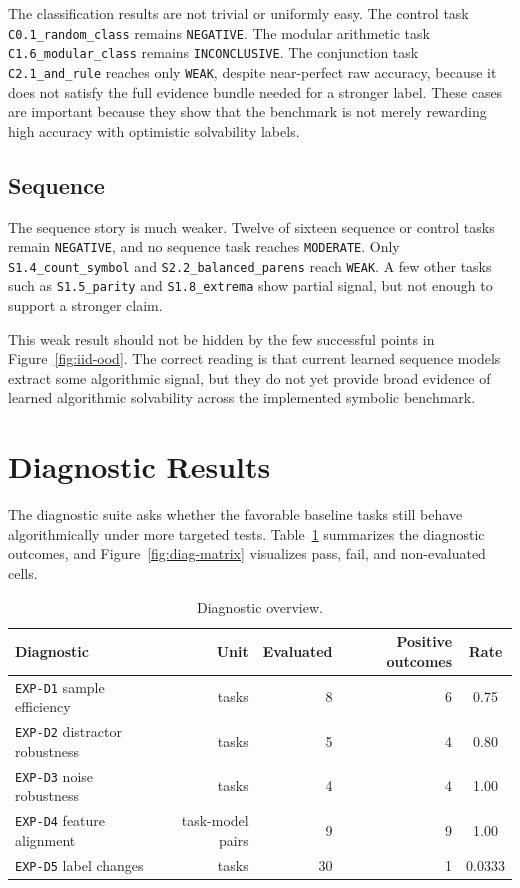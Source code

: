 \documentclass[11pt]{article}
\begin{document}
The classification results are not trivial or uniformly easy. The control task \texttt{C0.1\_random\_class} remains \texttt{NEGATIVE}. The modular arithmetic task \texttt{C1.6\_modular\_class} remains \texttt{INCONCLUSIVE}. The conjunction task \texttt{C2.1\_and\_rule} reaches only \texttt{WEAK}, despite near-perfect raw accuracy, because it does not satisfy the full evidence bundle needed for a stronger label. These cases are important because they show that the benchmark is not merely rewarding high accuracy with optimistic solvability labels.

\subsection{Sequence}

The sequence story is much weaker. Twelve of sixteen sequence or control tasks remain \texttt{NEGATIVE}, and no sequence task reaches \texttt{MODERATE}. Only \texttt{S1.4\_count\_symbol} and \texttt{S2.2\_balanced\_parens} reach \texttt{WEAK}. A few other tasks such as \texttt{S1.5\_parity} and \texttt{S1.8\_extrema} show partial signal, but not enough to support a stronger claim.

This weak result should not be hidden by the few successful points in Figure~\ref{fig:iid-ood}. The correct reading is that current learned sequence models extract some algorithmic signal, but they do not yet provide broad evidence of learned algorithmic solvability across the implemented symbolic benchmark.

\section{Diagnostic Results}

The diagnostic suite asks whether the favorable baseline tasks still behave algorithmically under more targeted tests. Table~\ref{tab:diagnostics} summarizes the diagnostic outcomes, and Figure~\ref{fig:diag-matrix} visualizes pass, fail, and non-evaluated cells.

\begin{table}[H]
\centering
\caption{Diagnostic overview.}
\label{tab:diagnostics}
\begin{tabular}{lrrrc}
\toprule
Diagnostic & Unit & Evaluated & Positive outcomes & Rate \\
\midrule
\texttt{EXP-D1} sample efficiency & tasks & 8 & 6 & 0.75 \\
\texttt{EXP-D2} distractor robustness & tasks & 5 & 4 & 0.80 \\
\texttt{EXP-D3} noise robustness & tasks & 4 & 4 & 1.00 \\
\texttt{EXP-D4} feature alignment & task-model pairs & 9 & 9 & 1.00 \\
\texttt{EXP-D5} label changes & tasks & 30 & 1 & 0.0333 \\
\bottomrule
\end{tabular}
\end{table}
\end{document}
